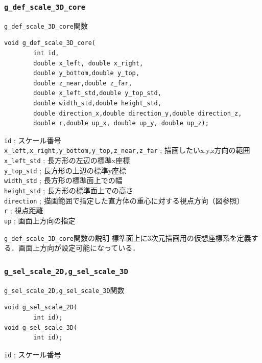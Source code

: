 \documentclass[a4paper,12pt]{jsarticle}%
\begin{document}
\clearpage
\subsubsection{\texttt{g\_def\_scale\_3D\_core}}

\begin{itembox}[l]{\texttt{g\_def\_scale\_3D\_core}関数}
\begin{verbatim}
void g_def_scale_3D_core(
        int id,
        double x_left, double x_right,
        double y_bottom,double y_top,
        double z_near,double z_far,
        double x_left_std,double y_top_std,
        double width_std,double height_std,
        double direction_x,double direction_y,double direction_z,
        double r,double up_x, double up_y, double up_z);
\end{verbatim}
\verb|id| ; スケール番号\\
\verb|x_left,x_right,y_bottom,y_top,z_near,z_far| ; 描画したいx,y,z方向の範囲\\
\verb|x_left_std| ; 長方形の左辺の標準x座標\\
\verb|y_top_std| ; 長方形の上辺の標準y座標\\
\verb|width_std| ; 長方形の標準面上での幅\\
\verb|height_std| ; 長方形の標準面上での高さ\\
\verb|direction| ; 描画範囲で指定した直方体の重心に対する視点方向（図参照）\\
\verb|r| ; 視点距離 \\
\verb|up| ; 画面上方向の指定 
\end{itembox}

\begin{itembox}[l]{\texttt{g\_def\_scale\_3D\_core}関数の説明}
標準面上に3次元描画用の仮想座標系を定義する．画面上方向が設定可能になっている．
\end{itembox}


\clearpage
\subsubsection{\texttt{g\_sel\_scale\_2D,g\_sel\_scale\_3D}}

\begin{itembox}[l]{\texttt{g\_sel\_scale\_2D,g\_sel\_scale\_3D}関数}
\begin{verbatim}
void g_sel_scale_2D(
        int id);
void g_sel_scale_3D(
        int id);
   \end{verbatim}
\verb|id| ; スケール番号\\
\end{itembox}
\end{document}
